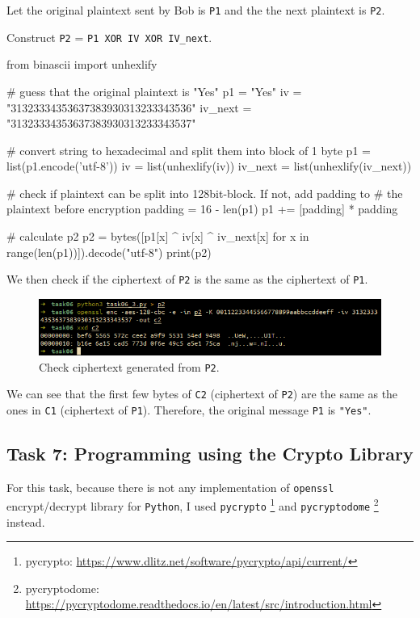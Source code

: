 \documentclass{article}
\begin{document}
Let the original plaintext sent by Bob is \texttt{P1} and the the next plaintext
is \texttt{P2}.

Construct \texttt{P2} = \texttt{P1 XOR IV XOR IV\_next}.

\begin{python}
from binascii import unhexlify

# guess that the original plaintext is "Yes"
p1 = "Yes"
iv = "31323334353637383930313233343536"
iv_next = "31323334353637383930313233343537"

# convert string to hexadecimal and split them into block of 1 byte
p1 = list(p1.encode('utf-8'))
iv = list(unhexlify(iv))
iv_next = list(unhexlify(iv_next))

# check if plaintext can be split into 128bit-block. If not, add padding to
# the plaintext before encryption
padding = 16 - len(p1) %
p1 += [padding] * padding

# calculate p2
p2 = bytes([p1[x] ^ iv[x] ^ iv_next[x] for x in range(len(p1))]).decode("utf-8")
print(p2)
\end{python}

We then check if the ciphertext of \texttt{P2} is the same as the ciphertext of
\texttt{P1}.

\begin{figure}[!ht]
    \centering
    \includegraphics[scale=0.68]{task06_3.png}
    \caption{Check ciphertext generated from \texttt{P2}.}
\end{figure}

We can see that the first few bytes of \texttt{C2} (ciphertext of \texttt{P2})
are the same as the ones in \texttt{C1} (ciphertext of \texttt{P1}). Therefore,
the original message \texttt{P1} is \texttt{"Yes"}.

\subsection{Task 7: Programming using the Crypto Library}

For this task, because there is not any implementation of \texttt{openssl}
encrypt/decrypt library for \texttt{Python}, I used \texttt{pycrypto} \footnote{pycrypto: \url{https://www.dlitz.net/software/pycrypto/api/current/}}
and \texttt{pycryptodome} \footnote{pycryptodome: \url{https://pycryptodome.readthedocs.io/en/latest/src/introduction.html}}
instead.
\end{document}
